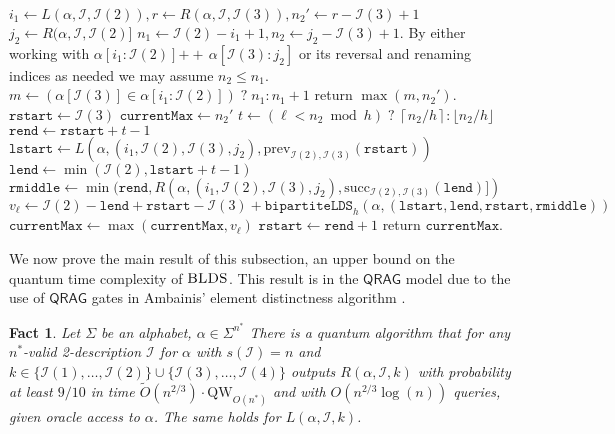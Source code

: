 \documentclass[12pt]{article}
\newcommand{\qw}{\mathrm{QW}}
\newcommand{\floor}[1]{\lfloor #1 \rfloor}
\newcommand{\ceil}[1]{\left\lceil #1 \right\rceil}
\newcommand{\concat}{\ensuremath{+\!\!\!\!+\,}}
\newcommand{\Iset}{\mathcal{I}}
\newcommand{\blds}{\textsc{BLDS}}
\newcommand{\prev}{\mathrm{prev}}
\newcommand{\suc}{\mathrm{succ}}
\newcommand{\rstart}{\texttt{rstart}}
\newcommand{\rend}{\texttt{rend}}
\newcommand{\rmiddle}{\texttt{rmiddle}}
\newcommand{\lstart}{\texttt{lstart}}
\newcommand{\lend}{\texttt{lend}}
\newcommand{\currentmax}{\texttt{currentMax}}
\newcommand{\upto}{\mathbin{:}}
\newtheorem{fact}[theorem]{Fact}
\theoremstyle{definition}
\begin{document}
\begin{algorithm}[!htbp]
\caption{$\texttt{bipartiteLDS}_h(\alpha, \Iset)$}
\label{alg:blds}
\begin{algorithmic}[1]
  \State $i_1 \gets L(\alpha, \Iset, \Iset(2)), r \gets R(\alpha, \Iset, \Iset(3)), 
    n_2' \gets r - \Iset(3) + 1$ \label{alg:line_one}
  \State $j_2 \gets R(\alpha, \Iset, \Iset(2)]$ \label{alg:line_two}
  \State $n_1 \gets \Iset(2) - i_1 + 1, n_2 \gets j_2 - \Iset(3) + 1$. By either working 
  with $\alpha[i_1 \upto \Iset(2)] \concat \alpha[\Iset(3) \upto j_2]$ or its reversal and renaming 
  indices as needed we may assume $n_2 \le n_1$.
  \label{alg:base_case}
    \State $m \gets  (\alpha[\Iset(3)] \in \alpha[i_1 \colon \Iset(2)]) \; ? \; n_1 \upto n_1 + 1$
    \State return $\max(m, n_2')$. \label{alg:return1}
  \EndIf
  \State $\rstart \gets \Iset(3)$
  \State $\currentmax \gets n_2'$
    \State $t \gets (\ell < n_2 \bmod h) \; ? \; \ceil{n_2/h} \upto \floor{n_2/h}$
    \State $\rend \gets \rstart + t - 1$
    \State $\lstart \gets L(\alpha, (i_1, \Iset(2), \Iset(3), j_2), \prev_{\Iset(2), \Iset(3)}(\rstart))$
    \State $\lend \gets \min(\Iset(2), \lstart + t - 1)$
    \State $\rmiddle \gets \min(\rend, R(\alpha, (i_1, \Iset(2), \Iset(3), j_2), \suc_{\Iset(2), \Iset(3)}(\lend)])$
    \State $v_\ell \gets \Iset(2) - \lend + \rstart - \Iset(3) + \texttt{bipartiteLDS}_h(\alpha, 
(\lstart, \lend, \rstart, \rmiddle))$
    \State $\currentmax \gets \max(\currentmax, v_\ell)$
    \State $\rstart \gets \rend + 1$
  \EndFor
  \State return $\currentmax$. \label{alg:return2}
\end{algorithmic}
\end{algorithm}

We now prove the main result of this subsection, an upper bound on the quantum time complexity of $\blds$.  This result is in the $\mathsf{QRAG}$ model due to the use of $\mathsf{QRAG}$ gates in Ambainis' element distinctness algorithm 
\cite{Amb07}.

\begin{fact}
\label{fact:ed_binary}
Let $\Sigma$ be an alphabet, $\alpha \in \Sigma^{n^*}$
There is a quantum algorithm that for any $n^*$-valid 2-description $\Iset$ for $\alpha$ with $s(\Iset) = n$ and
$k \in \{\Iset(1),\ldots, \Iset(2)\} \cup \{\Iset(3), \ldots, \Iset(4)\}$ outputs $R(\alpha, \Iset, k)$ with probability at least $9/10$ in time $\tilde O(n^{2/3}) \cdot \qw_{O(n^*)}$ and with $O(n^{2/3} \log(n))$ queries, given oracle access to $\alpha$.  The same holds for $L(\alpha, \Iset, k)$.
\end{fact}
\end{document}

